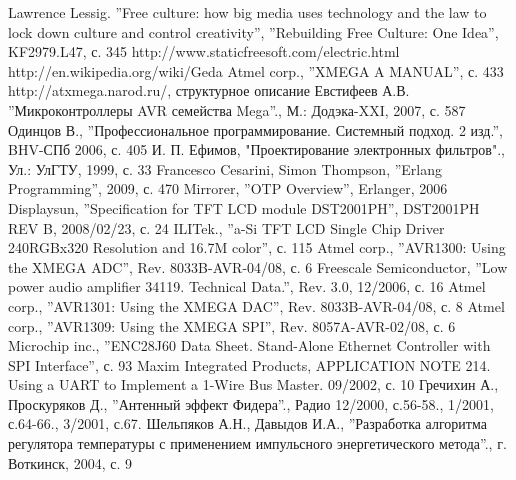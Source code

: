 \documentclass[russian,utf8,14pt,emptystyle,pointsubsection,reduceheight=0mm]{eskdtext}
\begin{document}
\begin{thebibliography}{99}
 Lawrence Lessig. ''Free culture: how big media uses technology and the law to lock down culture and control creativity'', ''Rebuilding Free Culture: One Idea'', KF2979.L47, с. 345
 http://www.staticfreesoft.com/electric.html
 http://en.wikipedia.org/wiki/Geda
 Atmel corp., ''XMEGA A MANUAL'', с. 433
 http://atxmega.narod.ru/, структурное описание
 Евстифеев А.В. ''Микроконтроллеры AVR семейства Mega''., М.: Додэка-XXI, 2007, с. 587
 Одинцов В., ''Профессиональное программирование. Системный подход. 2 изд.'', BHV-СПб 2006, с. 405
 И. П. Ефимов, "Проектирование электронных фильтров"., Ул.: УлГТУ, 1999, с. 33
 Francesco Cesarini, Simon Thompson, ''Erlang Programming'', 2009, с. 470
 Mirrorer, ''OTP Overview'', Erlanger, 2006
 Displaysun, ''Specification for TFT LCD module DST2001PH'', DST2001PH REV B, 2008/02/23, с. 24
 ILITek., ''a-Si TFT LCD Single Chip Driver 240RGBx320 Resolution and 16.7M color'', с. 115
 Atmel corp., ''AVR1300: Using the XMEGA ADC'', Rev. 8033B-AVR-04/08, с. 6
 Freescale Semiconductor, ''Low power audio amplifier 34119. Technical Data.'', Rev. 3.0, 12/2006, с. 16
 Atmel corp., ''AVR1301: Using the XMEGA DAC'', Rev. 8033B-AVR-04/08, с. 8
 Atmel corp., ''AVR1309: Using the XMEGA SPI'', Rev. 8057A-AVR-02/08, с. 6
 Microchip inc., ''ENC28J60 Data Sheet. Stand-Alone Ethernet Controller with SPI Interface'', с. 93
 Maxim Integrated Products, APPLICATION NOTE 214. Using a UART to Implement a 1-Wire Bus Master. 09/2002, с. 10
 Гречихин А., Проскуряков Д., ''Антенный эффект Фидера''., Радио 12/2000, с.56-58., 1/2001, с.64-66., 3/2001, с.67.
 Шельпяков А.Н., Давыдов И.А., ''Разработка алгоритма регулятора температуры с применением импульсного энергетического метода''., г. Воткинск, 2004, с. 9
\end{thebibliography}


\end{document}
